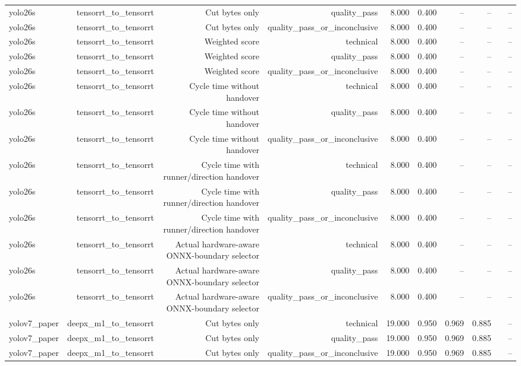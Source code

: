 \begin{table}[t]
\begin{tabular}{lrrrrrrrrr}
yolo26s & tensorrt\_to\_tensorrt & Cut bytes only & quality\_pass & 8.000 & 0.400 & -- & -- &  & -- \\
yolo26s & tensorrt\_to\_tensorrt & Cut bytes only & quality\_pass\_or\_inconclusive & 8.000 & 0.400 & -- & -- &  & -- \\
yolo26s & tensorrt\_to\_tensorrt & Weighted score & technical & 8.000 & 0.400 & -- & -- &  & -- \\
yolo26s & tensorrt\_to\_tensorrt & Weighted score & quality\_pass & 8.000 & 0.400 & -- & -- &  & -- \\
yolo26s & tensorrt\_to\_tensorrt & Weighted score & quality\_pass\_or\_inconclusive & 8.000 & 0.400 & -- & -- &  & -- \\
yolo26s & tensorrt\_to\_tensorrt & Cycle time without handover & technical & 8.000 & 0.400 & -- & -- &  & -- \\
yolo26s & tensorrt\_to\_tensorrt & Cycle time without handover & quality\_pass & 8.000 & 0.400 & -- & -- &  & -- \\
yolo26s & tensorrt\_to\_tensorrt & Cycle time without handover & quality\_pass\_or\_inconclusive & 8.000 & 0.400 & -- & -- &  & -- \\
yolo26s & tensorrt\_to\_tensorrt & Cycle time with runner/direction handover & technical & 8.000 & 0.400 & -- & -- &  & -- \\
yolo26s & tensorrt\_to\_tensorrt & Cycle time with runner/direction handover & quality\_pass & 8.000 & 0.400 & -- & -- &  & -- \\
yolo26s & tensorrt\_to\_tensorrt & Cycle time with runner/direction handover & quality\_pass\_or\_inconclusive & 8.000 & 0.400 & -- & -- &  & -- \\
yolo26s & tensorrt\_to\_tensorrt & Actual hardware-aware ONNX-boundary selector & technical & 8.000 & 0.400 & -- & -- &  & -- \\
yolo26s & tensorrt\_to\_tensorrt & Actual hardware-aware ONNX-boundary selector & quality\_pass & 8.000 & 0.400 & -- & -- &  & -- \\
yolo26s & tensorrt\_to\_tensorrt & Actual hardware-aware ONNX-boundary selector & quality\_pass\_or\_inconclusive & 8.000 & 0.400 & -- & -- &  & -- \\
yolov7\_paper & deepx\_m1\_to\_tensorrt & Cut bytes only & technical & 19.000 & 0.950 & 0.969 & 0.885 &  & -- \\
yolov7\_paper & deepx\_m1\_to\_tensorrt & Cut bytes only & quality\_pass & 19.000 & 0.950 & 0.969 & 0.885 &  & -- \\
yolov7\_paper & deepx\_m1\_to\_tensorrt & Cut bytes only & quality\_pass\_or\_inconclusive & 19.000 & 0.950 & 0.969 & 0.885 &  & -- \\

\end{tabular}
\end{table}
